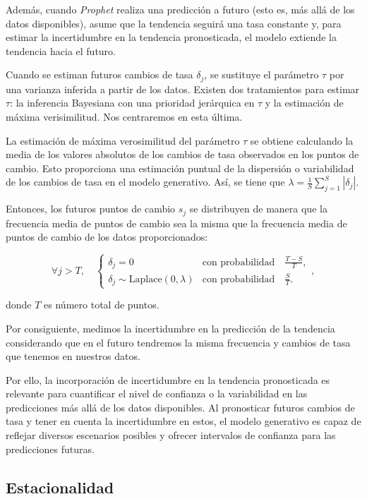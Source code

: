 \documentclass[12pt,twoside]{article}
\begin{document}
Además, cuando \textit{Prophet} realiza una predicción a futuro (esto es, más allá de los datos disponibles), asume que la tendencia seguirá una tasa constante y, para estimar la incertidumbre en la tendencia pronosticada, el modelo extiende la tendencia hacia el futuro. 

Cuando se estiman futuros cambios de tasa $\delta_j$, se sustituye el parámetro $\tau$ por una varianza inferida a partir de los datos. Existen dos tratamientos para estimar $\tau$: la inferencia Bayesiana con una prioridad jerárquica en $\tau$ y la estimación de máxima verisimilitud. Nos centraremos en esta última.

La estimación de máxima verosimilitud del parámetro $\tau$ se obtiene calculando la media de los valores absolutos de los cambios de tasa observados en los puntos de cambio. Esto proporciona una estimación puntual de la dispersión o variabilidad de los cambios de tasa en el modelo generativo. Así, se tiene que $\lambda = \frac{1}{S} \sum_{j=1}^{S} |\delta_j|
$. 

Entonces, los futuros puntos de cambio $s_j$ se distribuyen de manera que la frecuencia media de puntos de cambio sea la misma que la frecuencia media de puntos de cambio de los datos proporcionados:

\begin{equation}
\forall j > T, \quad 
\begin{cases} 
\delta_j = 0 & \text{con probabilidad} \quad \frac{T-S}{T}, \\
\delta_j \sim\text{Laplace}(0, \lambda) & \text{con probabilidad} \quad \frac{S}{T}.
\end{cases},
\end{equation}

donde $T$ es número total de puntos.

Por consiguiente, medimos la incertidumbre en la predicción de la tendencia considerando que en el futuro tendremos la misma frecuencia y cambios de tasa que tenemos en nuestros datos.

Por ello, la incorporación de incertidumbre en la tendencia pronosticada es relevante para cuantificar el nivel de confianza o la variabilidad en las predicciones más allá de los datos disponibles. Al pronosticar futuros cambios de tasa y tener en cuenta la incertidumbre en estos, el modelo generativo es capaz de reflejar diversos escenarios posibles y ofrecer intervalos de confianza para las predicciones futuras.

\subsection{Estacionalidad}\label{sec:5}
\end{document}
